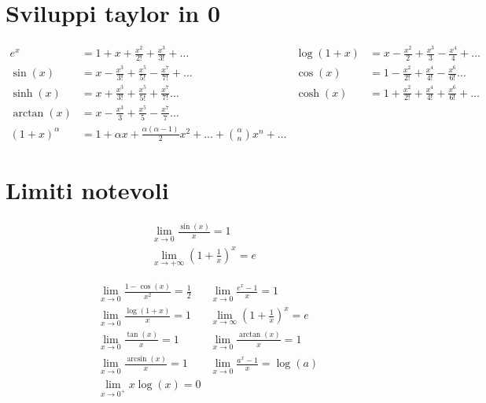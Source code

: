 \endofdump
%

\author{Mattia Marini}
\date{02.11.22}



\section{Sviluppi taylor in 0}
\begin{align*}
	e^{x} &=  1 + x + \frac{x^2}{2!} + \frac{x^{3}}{3!} + \ldots & \log \left( 1+x \right) &= x - \frac{x^2}{2}+ \frac{x^3}{3}- \frac{x^{4}}{4} + \ldots \\ 
	\sin \left( x \right) &=  x - \frac{x^3}{3!} + \frac{x^{5}}{5!}- \frac{x^{7}}{7!}+ \ldots & \cos \left( x \right) &=  1- \frac{x^2}{2!} + \frac{x^{4}}{4!} - \frac{x^{6}}{6!} \ldots\\
	\sinh \left( x \right) &=  x + \frac{x^3}{3!} + \frac{x^{5}}{5!} + \frac{x^{7}}{7!} \ldots& \cosh \left( x \right) &=  1 + \frac{x^2}{2!} + \frac{x^{4}}{4!} + \frac{x^{6}}{6!} + \ldots \\
	\arctan \left( x \right) &=  x - \frac{x^3}{3} + \frac{x^{5}}{5} - \frac{x^{7}}{7} \ldots & \\ \left( 1+x \right) ^{\alpha }&= 1 + \alpha  x + \frac{\alpha  \left( \alpha  -1 \right) }{2}x^2+ \ldots + \binom{\alpha }{n}x^{n} + \ldots
\end{align*}

\section{Limiti notevoli}
	\begin{gather*}
		\lim_{x \to 0} \frac{\sin\left( x \right) }{x} = 1 \\
		\lim_{x \to + \infty} \left( 1+\frac{1}{x} \right) ^{x} = e
	\end{gather*}

	\begin{align*}
		& \lim_{x \to 0} \frac{1-\cos\left( x \right) }{x^2} = \frac{1}{2} &\lim_{x \to 0} \frac{e^{x}-1}{x}=1 \\
		& \lim_{x \to 0} \frac{\log\left( 1+x \right) }{x}=1 &\lim_{x \to \infty} \left( 1+\frac{1}{x} \right) ^{x} = e\\
		& \lim_{x \to 0} \frac{ \tan \left( x \right) }{x}=1  & \lim_{x \to 0} \frac{\arctan \left( x \right) }{x} = 1  \\
		& \lim_{x \to 0} \frac{\arcsin \left( x \right) }{x} = 1 & \lim_{x \to 0} \frac{a^{x}-1}{x}= \log \left( a \right) \\
		& \lim_{x \to 0^{+}} x \log \left( x \right) =0
	\end{align*}
